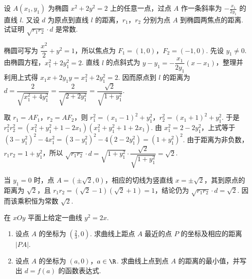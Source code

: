 \documentclass[UTF8,a4paper,oneside,11pt]{ctexbook}
\begin{document}
\begin{problem}
设 \(A(x_1,y_1)\) 为椭圆 \(x^2+2y^2=2\) 上的任意一点，过点 \(A\) 作一条斜率为 \(-\frac{x_1}{2y_1}\) 的直线 \(l\). 又设 \(d\) 为原点到直线 \(l\) 的距离，\(r_1\)，\(r_2\) 分别为点 \(A\) 到椭圆两焦点的距离. 试证明 \(\sqrt{r_1r_2}\cdot d\) 是常数.
\end{problem}

\begin{solution}
椭圆可写为 \(\dfrac{x^2}{2}+y^2=1\)，所以焦点为 \(F_1=(1,0)\)，\(F_2=(-1,0)\). 先设 \(y_1\neq0\). 由椭圆方程，\(x_1^2+2y_1^2=2\). 直线 \(l\) 的点斜式为 \(y-y_1=-\dfrac{x_1}{2y_1}(x-x_1)\)，整理并利用上式得
\(x_1x+2y_1y=x_1^2+2y_1^2=2\). 因而原点到 \(l\) 的距离为
\(d=\dfrac{2}{\sqrt{x_1^2+4y_1^2}}=\dfrac{2}{\sqrt{2+2y_1^2}}=\dfrac{\sqrt2}{\sqrt{1+y_1^2}}\).

取 \(r_1=AF_1\)，\(r_2=AF_2\)，则
\(r_1^2=(x_1-1)^2+y_1^2\)，\(r_2^2=(x_1+1)^2+y_1^2\). 于是
\(r_1^2r_2^2=\left(x_1^2+y_1^2+1-2x_1\right)\left(x_1^2+y_1^2+1+2x_1\right)\).
由 \(x_1^2=2-2y_1^2\)，上式等于
\(\left(3-y_1^2\right)^2-4x_1^2=\left(3-y_1^2\right)^2-4\left(2-2y_1^2\right)=\left(1+y_1^2\right)^2\).
由于距离为非负数，\(r_1r_2=1+y_1^2\)，所以
\(\sqrt{r_1r_2}\cdot d=\sqrt{1+y_1^2}\cdot\dfrac{\sqrt2}{\sqrt{1+y_1^2}}=\sqrt2\).

当 \(y_1=0\) 时，点 \(A=(\pm\sqrt2,0)\)，相应的切线为竖直线 \(x=\pm\sqrt2\)，其到原点的距离为 \(\sqrt2\)，且 \(r_1r_2=(\sqrt2-1)(\sqrt2+1)=1\)，结论仍为 \(\sqrt{r_1r_2}\cdot d=\sqrt2\). 因而该乘积恒为常数 \(\sqrt2\).
\end{solution}

\begin{problem}
在 \(xOy\) 平面上给定一曲线 \(y^2=2x\).

\begin{enumerate}
\item 设点 \(A\) 的坐标为 \(\left(\frac{2}{3},0\right)\). 求曲线上距点 \(A\) 最近的点 \(P\) 的坐标及相应的距离 \(|PA|\).
\item 设点 \(A\) 的坐标为 \((a,0)\)，\(a\in\R\). 求曲线上点到点 \(A\) 的距离的最小值，并写出 \(d=f(a)\) 的函数表达式.
\end{enumerate}
\end{problem}
\end{document}

